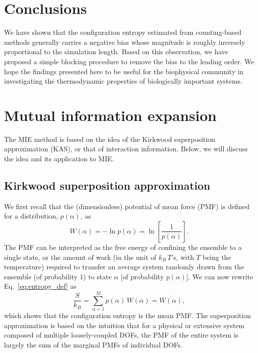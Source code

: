 \documentclass[reprint, superscriptaddress]{revtex4-1}
\begin{document}
\section{Conclusions}

We have shown that the configuration entropy estimated from counting-based methods
generally carries a negative bias whose magnitude
is roughly inversely proportional to the simulation length.
%
Based on this observation, we have proposed a simple blocking procedure
to remove the bias to the leading order.
%
We hope the findings presented here to be useful
for the biophysical community
in investigating the thermodynamic properties of
biologically important systems.


\appendix

\section{\label{sec:MIE_review}
Mutual information expansion}

The MIE method is based on the idea of
the Kirkwood superposition approximation (KAS)\cite{kirkwood1935, born1946},
or that of interaction information\cite{mcgill1954}.
%
Below, we will discuss the idea and its application to MIE.

\subsection{\label{sec:Kirkwood}
Kirkwood superposition approximation}

We first recall that the (dimensionless) potential of mean force (PMF)
is defined for a distribution, $p(\alpha)$,
as
$$
W(\alpha) = -\ln p(\alpha) = \ln\left[ \frac{1}{p(\alpha)} \right].
$$
The PMF can be interpreted as
the free energy of confining the ensemble to a single state,
or the amount of work
(in the unit of $k_B \, T$'s, with $T$ being the temperature)
required to transfer an average system randomly drawn from the ensemble (of probability $1$)
to state $\alpha$ [of probability $p(\alpha)$].
%
We can now rewrite Eq.~\eqref{eq:entropy_def} as
%
\begin{equation}
  \frac{S}{k_B}
  =
  \sum_{\alpha = 1}^M p(\alpha) \, W(\alpha)
  =
  \overline{ W(\alpha) }
  ,
  \label{eq:S_W}
\end{equation}
%
which shows that the configuration entropy
is the mean PMF.
%
The superposition approximation is based on the intuition
that for a physical or extensive system composed of
multiple loosely-coupled DOFs,
the PMF of the entire system is largely
the sum of the marginal PMFs of individual DOFs.
\end{document}
